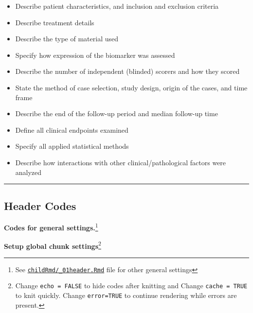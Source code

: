 \documentclass[
]{article}
\newenvironment{Shaded}{\begin{snugshade}}{\end{snugshade}}
\newcommand{\DataTypeTok}[1]{\textcolor[rgb]{0.00,0.34,0.68}{#1}}
\newcommand{\DecValTok}[1]{\textcolor[rgb]{0.69,0.50,0.00}{#1}}
\newcommand{\KeywordTok}[1]{\textcolor[rgb]{0.12,0.11,0.11}{\textbf{#1}}}
\newcommand{\NormalTok}[1]{\textcolor[rgb]{0.12,0.11,0.11}{#1}}
\newcommand{\OperatorTok}[1]{\textcolor[rgb]{0.12,0.11,0.11}{#1}}
\newcommand{\OtherTok}[1]{\textcolor[rgb]{0.00,0.43,0.16}{#1}}
\newcommand{\StringTok}[1]{\textcolor[rgb]{0.75,0.01,0.01}{#1}}
\begin{document}
\begin{itemize}
\item
  Describe patient characteristics, and inclusion and exclusion criteria
\item
  Describe treatment details
\item
  Describe the type of material used
\item
  Specify how expression of the biomarker was assessed
\item
  Describe the number of independent (blinded) scorers and how they
  scored
\item
  State the method of case selection, study design, origin of the cases,
  and time frame
\item
  Describe the end of the follow-up period and median follow-up time
\item
  Define all clinical endpoints examined
\item
  Specify all applied statistical methods
\item
  Describe how interactions with other clinical/pathological factors
  were analyzed
\end{itemize}

\begin{center}\rule{0.5\linewidth}{0.5pt}\end{center}

\hypertarget{header-codes}{%
\subsection{Header Codes}\label{header-codes}}

\textbf{Codes for general settings.}\footnote{See
  \href{https://github.com/sbalci/histopathology-template/blob/master/childRmd/_01header.Rmd}{\texttt{childRmd/\_01header.Rmd}}
  file for other general settings}

\textbf{Setup global chunk settings}\footnote{Change
  \texttt{echo\ =\ FALSE} to hide codes after knitting and Change
  \texttt{cache\ =\ TRUE} to knit quickly. Change \texttt{error=TRUE} to
  continue rendering while errors are present.}

\begin{Shaded}
\end{Shaded}
\end{document}
